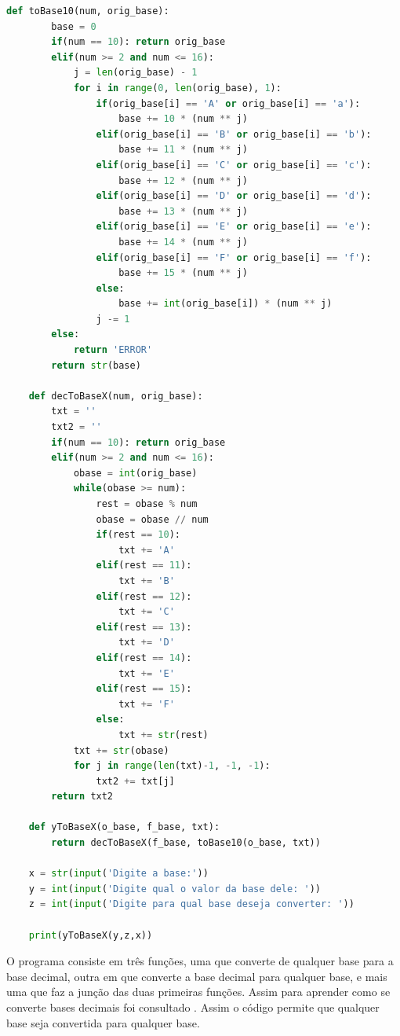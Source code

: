 \begin{lstlisting}[language=Python]
    def toBase10(num, orig_base):
        base = 0
        if(num == 10): return orig_base
        elif(num >= 2 and num <= 16):
            j = len(orig_base) - 1
            for i in range(0, len(orig_base), 1):
                if(orig_base[i] == 'A' or orig_base[i] == 'a'):
                    base += 10 * (num ** j)
                elif(orig_base[i] == 'B' or orig_base[i] == 'b'):
                    base += 11 * (num ** j)
                elif(orig_base[i] == 'C' or orig_base[i] == 'c'):
                    base += 12 * (num ** j)
                elif(orig_base[i] == 'D' or orig_base[i] == 'd'):
                    base += 13 * (num ** j)
                elif(orig_base[i] == 'E' or orig_base[i] == 'e'):
                    base += 14 * (num ** j)
                elif(orig_base[i] == 'F' or orig_base[i] == 'f'):
                    base += 15 * (num ** j)
                else:
                    base += int(orig_base[i]) * (num ** j)
                j -= 1
        else:
            return 'ERROR'
        return str(base)

    def decToBaseX(num, orig_base):
        txt = ''
        txt2 = ''
        if(num == 10): return orig_base
        elif(num >= 2 and num <= 16):
            obase = int(orig_base)
            while(obase >= num):
                rest = obase % num
                obase = obase // num
                if(rest == 10):
                    txt += 'A'
                elif(rest == 11):
                    txt += 'B'
                elif(rest == 12):
                    txt += 'C'
                elif(rest == 13):
                    txt += 'D'
                elif(rest == 14):
                    txt += 'E'
                elif(rest == 15):
                    txt += 'F'
                else:
                    txt += str(rest)
            txt += str(obase)
            for j in range(len(txt)-1, -1, -1):
                txt2 += txt[j]
        return txt2

    def yToBaseX(o_base, f_base, txt):
        return decToBaseX(f_base, toBase10(o_base, txt))

    x = str(input('Digite a base:'))
    y = int(input('Digite qual o valor da base dele: '))
    z = int(input('Digite para qual base deseja converter: '))

    print(yToBaseX(y,z,x))

\end{lstlisting}

O programa consiste em três funções, uma que converte de qualquer base para a base decimal, outra em que converte a base decimal para qualquer base, e mais uma que faz a junção das duas primeiras funções. Assim para aprender como se converte bases decimais foi consultado \cite{APRENDAA3:online}. Assim o código permite que qualquer base seja convertida para qualquer base.




